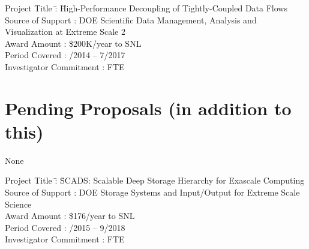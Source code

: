 \documentclass[10pt]{article}
\begin{document}
\begin{tabbing}
Project Title \hspace{5.5em}\=: \= High-Performance Decoupling of Tightly-Coupled Data Flows\\
Source of Support           \>: \> DOE Scientific Data Management, Analysis and Visualization at Extreme Scale 2\\
Award Amount                \>: \> \$200K/year to SNL\\
Period Covered              \>: /2014 -- 7/2017\\
Investigator Commitment     \>:  FTE
\end{tabbing}

\section*{Pending Proposals (in addition to this)}

None

\begin{tabbing}
Project Title \hspace{5.5em}\=: \= SCADS: Scalable Deep Storage Hierarchy for Exascale Computing\\
Source of Support           \>: \> DOE Storage Systems and Input/Output for Extreme Scale Science\\
Award Amount                \>: \> \$176/year to SNL\\
Period Covered              \>: /2015 -- 9/2018\\
Investigator Commitment     \>:  FTE
\end{tabbing}
\end{document}
